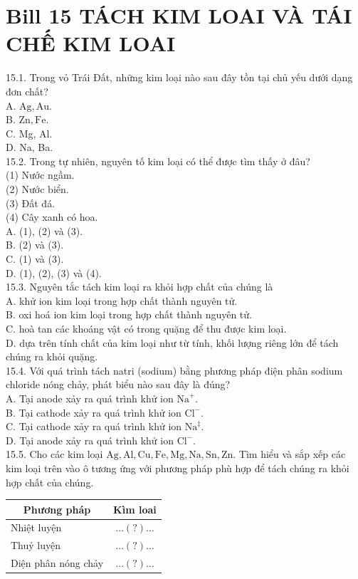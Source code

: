 \documentclass[10pt]{article}
\begin{document}
\section*{Bill 15 TÁCH KIM LOAI VÀ TÁI CHẾ KIM LOAI}
15.1. Trong vỏ Trái Đất, những kim loại nào sau đây tồn tại chủ yếu dưới dạng đơn chất?\\
A. $\mathrm{Ag}, \mathrm{Au}$.\\
B. $\mathrm{Zn}, \mathrm{Fe}$.\\
C. Mg, Al.\\
D. Na, Ba.\\
15.2. Trong tự nhiên, nguyên tố kim loại có thể được tìm thấy ở đâu?\\
(1) Nước ngầm.\\
(2) Nước biển.\\
(3) Đất đá.\\
(4) Cây xanh có hoa.\\
A. (1), (2) và (3).\\
B. (2) và (3).\\
C. (1) và (3).\\
D. (1), (2), (3) và (4).\\
15.3. Nguyên tắc tách kim loại ra khỏi hợp chất của chúng là\\
A. khử ion kim loại trong hợp chất thành nguyên tử.\\
B. oxi hoá ion kim loại trong hợp chất thành nguyên tử.\\
C. hoà tan các khoáng vật có trong quặng để thu được kim loại.\\
D. dựa trên tính chất của kim loại như từ tính, khối lượng riêng lớn để tách chúng ra khỏi quặng.\\
15.4. Với quá trình tách natri (sodium) bằng phương pháp điện phân sodium chloride nóng chảy, phát biểu nào sau đây là đúng?\\
A. Tại anode xảy ra quá trình khử ion $\mathrm{Na}^{+}$.\\
B. Tại cathode xảy ra quá trình khử ion $\mathrm{Cl}^{-}$.\\
C. Tại cathode xảy ra quá trình khử ion $\mathrm{Na}^{\ddagger}$.\\
D. Tại anode xảy ra quá trình khử ion $\mathrm{Cl}^{-}$.\\
15.5. Cho các kim loại $\mathrm{Ag}, \mathrm{Al}, \mathrm{Cu}, \mathrm{Fe}, \mathrm{Mg}, \mathrm{Na}, \mathrm{Sn}, \mathrm{Zn}$. Tìm hiểu và sắp xếp các kim loại trên vào ô tương ứng với phương pháp phù hợp để tách chúng ra khỏi hợp chất của chúng.

\begin{center}
\begin{tabular}{|l|c|}
\hline
\multicolumn{1}{|c|}{Phương pháp} & Kìm loai \\
\hline
Nhiệt luyện & $\ldots(?) \ldots$ \\
\hline
Thuỷ luyện & $\ldots(?) \ldots$ \\
\hline
Diện phân nóng chảy & $\ldots(?) \ldots$ \\
\hline
\end{tabular}
\end{center}
\end{document}
